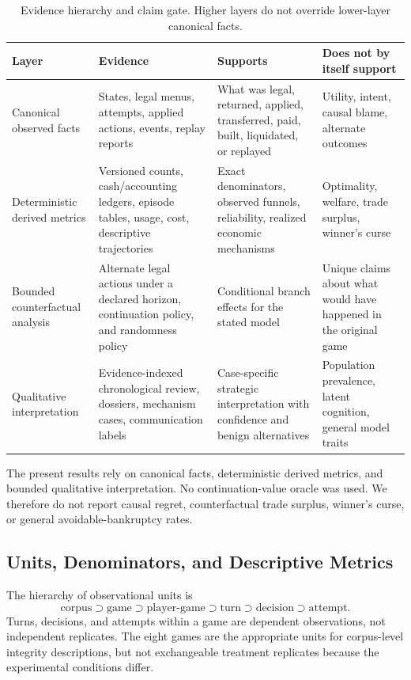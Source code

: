 \documentclass[conference]{IEEEtran}
\begin{document}
\begin{table}[t]
\caption{Evidence hierarchy and claim gate. Higher layers do not override lower-layer canonical facts.}
\label{tab:evidence_layers}
\centering
\small
\begin{tabularx}{\textwidth}{@{}p{}p{}Y Y@{}}
\toprule
\textbf{Layer} & \textbf{Evidence} & \textbf{Supports} & \textbf{Does not by itself support} \\
\midrule
Canonical observed facts & States, legal menus, attempts, applied actions, events, replay reports & What was legal, returned, applied, transferred, paid, built, liquidated, or replayed & Utility, intent, causal blame, alternate outcomes \\
Deterministic derived metrics & Versioned counts, cash/accounting ledgers, episode tables, usage, cost, descriptive trajectories & Exact denominators, observed funnels, reliability, realized economic mechanisms & Optimality, welfare, trade surplus, winner's curse \\
Bounded counterfactual analysis & Alternate legal actions under a declared horizon, continuation policy, and randomness policy & Conditional branch effects for the stated model & Unique claims about what would have happened in the original game \\
Qualitative interpretation & Evidence-indexed chronological review, dossiers, mechanism cases, communication labels & Case-specific strategic interpretation with confidence and benign alternatives & Population prevalence, latent cognition, general model traits \\
\bottomrule
\end{tabularx}
\end{table}

The present results rely on canonical facts, deterministic derived metrics, and bounded qualitative interpretation. No continuation-value oracle was used. We therefore do not report causal regret, counterfactual trade surplus, winner's curse, or general avoidable-bankruptcy rates.

\subsection{Units, Denominators, and Descriptive Metrics}

The hierarchy of observational units is
\[
\text{corpus} \supset \text{game} \supset \text{player-game} \supset \text{turn} \supset \text{decision} \supset \text{attempt}.
\]
Turns, decisions, and attempts within a game are dependent observations, not independent replicates. The eight games are the appropriate units for corpus-level integrity descriptions, but not exchangeable treatment replicates because the experimental conditions differ.
\end{document}
